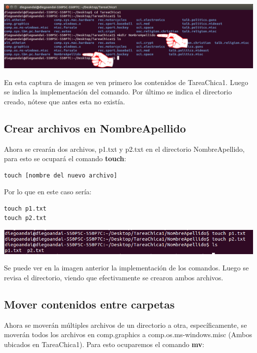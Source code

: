 \documentclass[a4paper,11pt]{article}
\theoremstyle{mytheor}
\begin{document}
\begin{center}
\includegraphics[scale=0.385]{tc1_6.png}
\end{center}

En esta captura de imagen se ven primero los contenidos de TareaChica1. Luego se indica la implementación del comando. Por último se indica el directorio creado, nótese que antes esta no existía.

\subsection{Crear archivos en NombreApellido}

Ahora se crearán dos archivos, p1.txt y p2.txt en el directorio NombreApellido, para esto se ocupará el comando \textbf{touch}:

\begin{lstlisting}
touch [nombre del nuevo archivo]
\end{lstlisting}

Por lo que en este caso sería:

\begin{lstlisting}
touch p1.txt
touch p2.txt
\end{lstlisting}

\begin{center}
\includegraphics[scale=0.55]{tc1_7.png}
\end{center}

Se puede ver en la imagen anterior la implementación de los comandos. Luego se revisa el directorio, viendo que efectivamente se crearon ambos archivos.

\subsection{Mover contenidos entre carpetas}

Ahora se moverán múltiples archivos de un directorio a otra, específicamente, se moverán todos los archivos en comp.graphics a comp.os.ms-windows.misc (Ambos ubicados en TareaChica1). Para esto ocuparemos el comando \textbf{mv}:
\end{document}
